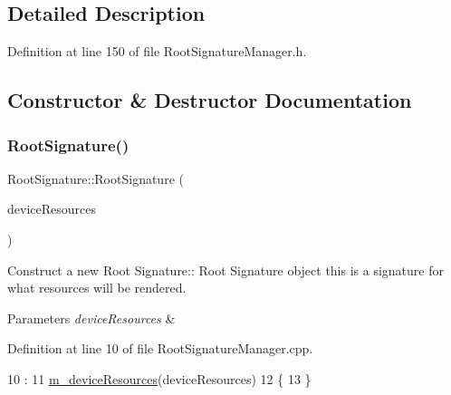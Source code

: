 \subsection{Detailed Description}


Definition at line 150 of file Root\+Signature\+Manager.\+h.



\subsection{Constructor \& Destructor Documentation}
\mbox{\label{class_root_signature_a63dcaba2a8dfab28c0eb3fc6b72669ba}} 
\subsubsection{\texorpdfstring{Root\+Signature()}{RootSignature()}}
{\footnotesize\ttfamily Root\+Signature\+::\+Root\+Signature (\begin{DoxyParamCaption}\item[{const std\+::shared\+\_\+ptr$<$ \mbox{\hyperlink{class_d_x_1_1_device_resources}{D\+X\+::\+Device\+Resources}} $>$}]{device\+Resources }\end{DoxyParamCaption})}



Construct a new Root Signature\+:\+: Root Signature object this is a signature for what resources will be rendered. 


\begin{DoxyParams}{Parameters}
{\em device\+Resources} & \\
\hline
\end{DoxyParams}


Definition at line 10 of file Root\+Signature\+Manager.\+cpp.


\begin{DoxyCode}
10                                                                                   :
11 \mbox{\hyperlink{class_root_signature_a6232742884741b5e773d00fee5e9c4ba}{m\_deviceResources}}(deviceResources)
12 \{
13 \}
\end{DoxyCode}
\mbox{\label{class_root_signature_a8007fe3581f6e8dfb5e8d8fc57263000}} 
